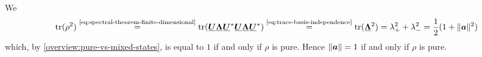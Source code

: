 We 
\[
\Trace(\rho^2)
\overset{\text{\eqref{eq:spectral-theorem-finite-dimensional}}}{=}
\Trace(
\matr{U} \matr{\Lambda} \matr{U}^* \matr{U} \matr{\Lambda} \matr{U}^*
) 
\overset{\text{\eqref{eq:trace-basis-independence}}}{=}
\Trace(\matr{\Lambda}^2)
=
\lambda_+^2+\lambda_-^2
=
\frac12(1+\|\vect a\|^2)
\]
which, by \autoref{overview:pure-vs-mixed-states}, is equal to \(1\) if and only if \(\rho\) is pure.
Hence $\|{\boldsymbol{a}}\|=1$ if and only if $\rho$ is pure.


